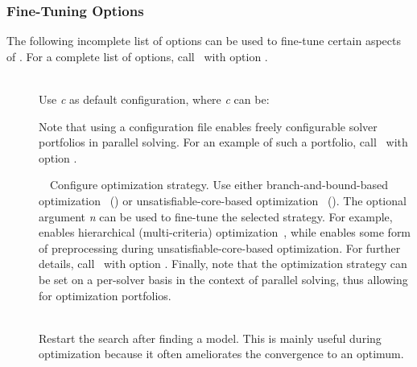 \subsubsection{Fine-Tuning Options}\label{subsec:clasp:tune}
The following incomplete list of options can be used to
fine-tune certain aspects of \clasp.
For a complete list of options,
call \clasp\ with option .
\begin{description}
  \item[]~\\
    Use \textit{c} as default configuration, where \textit{c} can be:
    Note that using a configuration file enables freely configurable
    solver portfolios in parallel solving. For an example of such a portfolio,
    call \clasp\ with option .
  \item[]~\
    Configure optimization strategy. Use either
    branch-and-bound-based optimization~\cite{gekakasc11c} () or
    unsatisfiable-core-based optimization~\cite{ankamasc12a} (\code{usc}).
    The optional argument \textit{n} can be used to fine-tune the selected strategy.
    For example, \code{bb,1} enables hierarchical (multi-criteria) optimization~\cite{gekakasc11c},
    while \code{usc,1} enables some form of preprocessing during unsatisfiable-core-based optimization.
    For further details, call \clasp\ with option \code{--help=2}.
    Finally, note that the optimization strategy can be set on a per-solver basis
    in the context of parallel solving, thus allowing for optimization portfolios.
  \item[\code{--restart-on-model}]~\\
    Restart the search after finding a model.
    This is mainly useful during optimization because
    it often ameliorates the convergence to an optimum.


\end{description}
